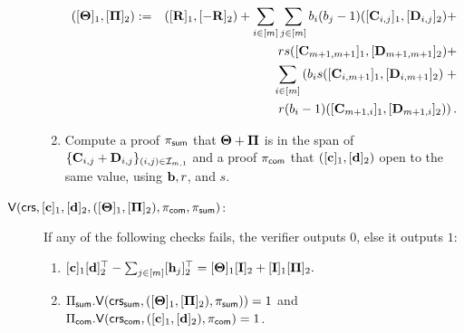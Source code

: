 \begin{description}
\begin{enumerate}
\else
\begin{eqnarray*}
([\mathbf{{\Theta}}]_1, [\mathbf{{\Pi}}]_2) & := & ([\mathbf{{R}}]_1,[-\mathbf{{R}}]_2)+
\sum_{i\in[m]}\sum_{j\in[m]}b_i(b_j-1)([\mathbf{{C}}_{i,j}]_1,[\mathbf{{D}}_{i,j}]_2)+\\
& &     rs([\mathbf{{C}}_{m+1,m+1}]_1,[\mathbf{{D}}_{m+1,m+1}]_2)+\\
& &  \sum_{i \in [m]}
 \left(b_i s  ([\mathbf{{C}}_{i,m+1}]_1,[\mathbf{{D}}_{i,m+1}]_2)\right. +\\
& & \left.r(b_i-1) ([\mathbf{{C}}_{m+1,i}]_1,[\mathbf{{D}}_{m+1,i}]_2)\right).
\end{eqnarray*}
\fi
\item Compute a proof $\pi_{\mathsf{sum}}$
that $\mathbf{{\Theta}}+\mathbf{{\Pi}}$ is in the span of 
$\{\mathbf{{C}}_{i,j}+\mathbf{{D}}_{i,j}\}_{(i,j)\in\mathcal{I}_{m,1}}$
and a proof $\pi_{\mathsf{com}}$
that
$([\mathbf{c}]_1,[\mathbf{d}]_2)$ open to the same value,
using $\mathbf{b},r$, and $s$. \\
\end{enumerate}

\item[{$\mathsf{V}(
    \mathsf{crs},
    [\mathbf{c}]_1,
    [\mathbf{d}]_2,
        ([\mathbf{{\Theta}}]_1, [\mathbf{{\Pi}}]_2), 
        \pi_{\mathsf{com}},\pi_{\mathsf{sum}} )$}:] If any of the following checks fails, the verifier outputs $0$, else it outputs $1$:
%   
\begin{enumerate}
\item 
$[\mathbf{c}]_1 [\mathbf{d}]_2^\top-
    \sum_{j \in [m]} [\mathbf{h}_j]_2^\top =
    [\mathbf{{\Theta}}]_1 [\mathbf{{I}}]_2 +  [\mathbf{{I}}]_1 [\mathbf{{\Pi}}]_2.$
  \item $\Pi_{\mathsf{sum}}.\mathsf{V}(\mathsf{crs}_{\mathsf{sum}},([\mathbf{{\Theta}}]_1,[\mathbf{{\Pi}}]_2),\pi_{\mathsf{sum}}))=1$ and $\Pi_{\mathsf{com}}.\mathsf{V}(\mathsf{crs}_{\mathsf{com}},([\mathbf{c}]_1,[\mathbf{d}]_2),\pi_{\mathsf{com}})=1$.
\end{enumerate}


\end{description}
